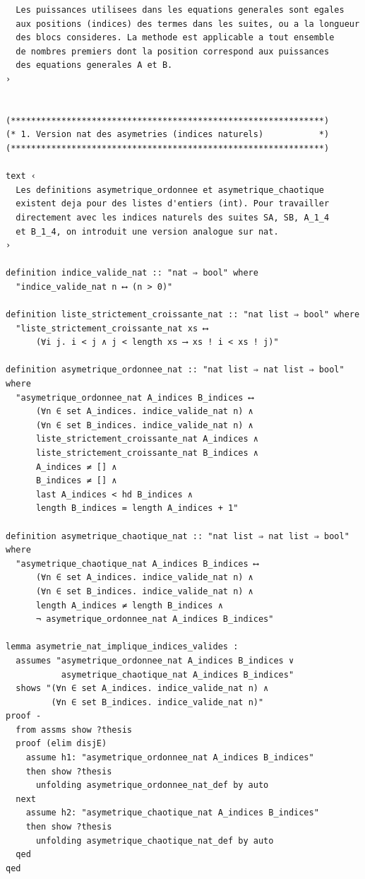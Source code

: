 \documentclass[a4paper,11pt]{article}
\begin{document}
\begin{holcode}[title={\textcolor{white}{File: methode\_spectral.thy -- Part 1/4}}]
\begin{lstlisting}
  Les puissances utilisees dans les equations generales sont egales
  aux positions (indices) des termes dans les suites, ou a la longueur
  des blocs consideres. La methode est applicable a tout ensemble
  de nombres premiers dont la position correspond aux puissances
  des equations generales A et B.
›


(**************************************************************)
(* 1. Version nat des asymetries (indices naturels)           *)
(**************************************************************)

text ‹
  Les definitions asymetrique_ordonnee et asymetrique_chaotique
  existent deja pour des listes d'entiers (int). Pour travailler
  directement avec les indices naturels des suites SA, SB, A_1_4
  et B_1_4, on introduit une version analogue sur nat.
›

definition indice_valide_nat :: "nat ⇒ bool" where
  "indice_valide_nat n ⟷ (n > 0)"

definition liste_strictement_croissante_nat :: "nat list ⇒ bool" where
  "liste_strictement_croissante_nat xs ⟷
      (∀i j. i < j ∧ j < length xs ⟶ xs ! i < xs ! j)"

definition asymetrique_ordonnee_nat :: "nat list ⇒ nat list ⇒ bool" where
  "asymetrique_ordonnee_nat A_indices B_indices ⟷
      (∀n ∈ set A_indices. indice_valide_nat n) ∧
      (∀n ∈ set B_indices. indice_valide_nat n) ∧
      liste_strictement_croissante_nat A_indices ∧
      liste_strictement_croissante_nat B_indices ∧
      A_indices ≠ [] ∧
      B_indices ≠ [] ∧
      last A_indices < hd B_indices ∧
      length B_indices = length A_indices + 1"

definition asymetrique_chaotique_nat :: "nat list ⇒ nat list ⇒ bool" where
  "asymetrique_chaotique_nat A_indices B_indices ⟷
      (∀n ∈ set A_indices. indice_valide_nat n) ∧
      (∀n ∈ set B_indices. indice_valide_nat n) ∧
      length A_indices ≠ length B_indices ∧
      ¬ asymetrique_ordonnee_nat A_indices B_indices"

lemma asymetrie_nat_implique_indices_valides :
  assumes "asymetrique_ordonnee_nat A_indices B_indices ∨
           asymetrique_chaotique_nat A_indices B_indices"
  shows "(∀n ∈ set A_indices. indice_valide_nat n) ∧
         (∀n ∈ set B_indices. indice_valide_nat n)"
proof -
  from assms show ?thesis
  proof (elim disjE)
    assume h1: "asymetrique_ordonnee_nat A_indices B_indices"
    then show ?thesis
      unfolding asymetrique_ordonnee_nat_def by auto
  next
    assume h2: "asymetrique_chaotique_nat A_indices B_indices"
    then show ?thesis
      unfolding asymetrique_chaotique_nat_def by auto
  qed
qed



\end{lstlisting}
\end{holcode}
\end{document}
